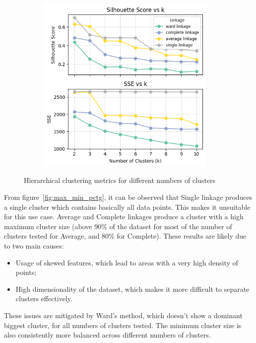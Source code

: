 \begin{figure}[H]
\begin{subfigure}[t]{0.49\textwidth}
        \includegraphics[width=0.95\textwidth]{plots/sil_sse_hierarchical_clust.png}
        \label{fig:sil_sse_hierarchical_clust}
    \end{subfigure}
    \caption{Hierarchical clustering metrics for different numbers of clusters}
    \label{fig:hier_clust_stats}
\end{figure}

From figure~\ref{fig:max_min_pctg}, it can be observed that Single linkage produces a single cluster which contains basically all data points. This makes it unsuitable for this use case.
Average and Complete linkages produce a cluster with a high maximum cluster size (above 90\% of the dataset for most
of the number of clusters tested for Average, and 80\% for Complete).
These results are likely due to two main causes: 
\begin{itemize}
    \item Usage of skewed features, which lead to areas with a very high density of points;
    \item High dimensionality of the dataset, which makes it more difficult to separate clusters effectively.
\end{itemize}

These issues are mitigated by Ward's method, which doesn't show a dominant biggest cluster, for
all numbers of clusters tested. The minimum cluster size is also consistently more balanced
across different numbers of clusters.\\


